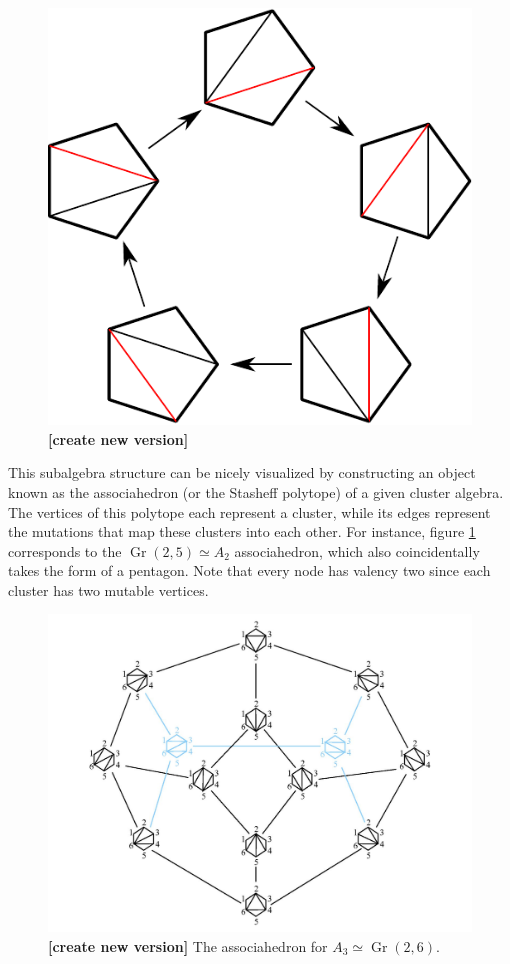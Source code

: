 \documentclass[11pt]{article}
\DeclareMathOperator{\Gr}{Gr}
\def\draftnote#1{{\bf [#1]}}
\begin{document}
\begin{figure}
  \centering
  \includegraphics[scale=0.6]{pentagon-triangulations}
  \caption{\draftnote{create new version}}
  \label{fig:a2-poly}
\end{figure}

This subalgebra structure can be nicely visualized by constructing an object known as the associahedron (or the Stasheff polytope) of a given cluster algebra. The vertices of this polytope each represent a cluster, while its edges represent the mutations that map these clusters into each other. For instance, figure \ref{fig:a2-poly} corresponds to the $\Gr(2,5) \simeq A_2$ associahedron, which also coincidentally takes the form of a pentagon. Note that every node has valency two since each cluster has two mutable vertices.

\begin{figure}
  \centering
  \includegraphics[scale=0.25]{a3-associahedron}
  \caption{ \draftnote{create new version} The associahedron for $A_3\simeq\Gr(2,6)$.}
  \label{fig:a3-poly}
\end{figure}
\end{document}
